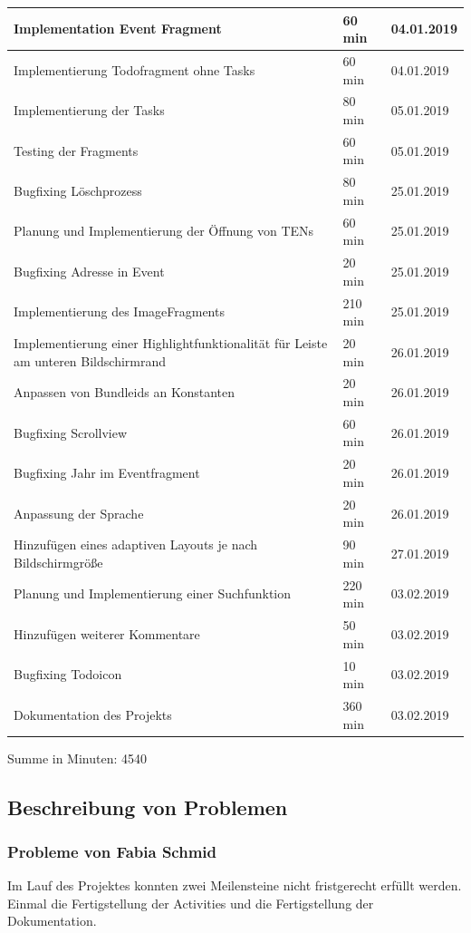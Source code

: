 \begin{longtable}{|p{10cm}|p{2cm}|p{2cm}|}
Implementation Event Fragment & 60 min & 04.01.2019\\ \hline 
Implementierung Todofragment ohne Tasks & 60 min & 04.01.2019\\ \hline 
Implementierung der Tasks & 80 min & 05.01.2019\\ \hline 
Testing der Fragments & 60 min & 05.01.2019\\ \hline 
Bugfixing Löschprozess & 80 min & 25.01.2019\\ \hline 
Planung und Implementierung der Öffnung von TENs & 60 min & 25.01.2019\\ \hline 
Bugfixing Adresse in Event & 20 min & 25.01.2019\\ \hline 
Implementierung des ImageFragments & 210 min & 25.01.2019\\ \hline 
Implementierung einer Highlightfunktionalität für Leiste am unteren Bildschirmrand & 20 min & 26.01.2019\\ \hline 
Anpassen von Bundleids an Konstanten & 20 min & 26.01.2019\\ \hline 
Bugfixing Scrollview & 60 min & 26.01.2019\\ \hline 
Bugfixing Jahr im Eventfragment & 20 min & 26.01.2019\\ \hline 
Anpassung der Sprache & 20 min & 26.01.2019\\ \hline 
Hinzufügen eines adaptiven Layouts je nach Bildschirmgröße & 90 min & 27.01.2019\\ \hline 
Planung und Implementierung einer Suchfunktion & 220 min & 03.02.2019\\ \hline 
Hinzufügen weiterer Kommentare & 50 min & 03.02.2019\\ \hline 
Bugfixing Todoicon & 10 min & 03.02.2019\\ \hline 
Dokumentation des Projekts & 360 min & 03.02.2019\\ \hline 
\end{longtable}
Summe in Minuten: 4540


\newpage
\subsection{Beschreibung von Problemen}

\subsubsection{Probleme von Fabia Schmid}
Im Lauf des Projektes konnten zwei Meilensteine nicht fristgerecht erfüllt werden. Einmal die Fertigstellung der Activities und die Fertigstellung der Dokumentation.
 
